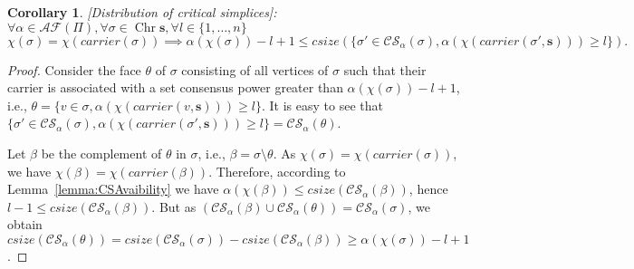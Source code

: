 \documentclass[a4paper]{article}
\newtheorem{corollary}[theorem]{Corollary}
\def\HSS{\mathit{csize}}
\def\s {\mathbf{s}}
\def\Chr{\operatorname{Chr}}
\def\Car{\mathit{carrier}}
\begin{document}
\begin{corollary}{[Distribution of critical simplices]:\label{lemma:CSDistribution}}
$\forall\alpha\in\mathcal{AF}(\Pi),\forall\sigma\in\Chr\s,\forall l\in\{1,\dots,n\}$
\[\chi(\sigma)=\chi(\Car(\sigma)) \implies 
\alpha(\chi(\sigma))-l+1\leq \HSS(\{\sigma'\in\mathcal{CS}_\alpha(\sigma), \alpha(\chi(\Car(\sigma',\s)))\geq l\}){}.\]
\end{corollary}

\begin{proof}
Consider the face $\theta$ of $\sigma$ consisting of 
all vertices of $\sigma$ such that their carrier is associated 
with a set consensus power greater than $\alpha(\chi(\sigma))-l+1$, 
i.e., $\theta = \{v\in \sigma, \alpha(\chi(\Car(v,\s)))\geq l\}$.
It is easy to see 
that~$\{\sigma'\in\mathcal{CS}_\alpha(\sigma), \alpha(\chi(\Car(\sigma',\s)))\geq l\}=\mathcal{CS}_\alpha(\theta)$.

Let $\beta$ be the complement of $\theta$ in $\sigma$, i.e., $\beta=\sigma\setminus\theta$. 
As $\chi(\sigma)=\chi(\Car(\sigma))$, we have $\chi(\beta)=\chi(\Car(\beta))$. 
Therefore, according to Lemma~\ref{lemma:CSAvaibility} we have 
$\alpha(\chi(\beta))\leq \HSS(\mathcal{CS}_\alpha(\beta))$, hence 
$l-1\leq \HSS(\mathcal{CS}_\alpha(\beta))$.
But as $\left(\mathcal{CS}_\alpha(\beta)\cup\mathcal{CS}_\alpha(\theta)\right)=
\mathcal{CS}_\alpha(\sigma)$, we obtain 
$\HSS(\mathcal{CS}_\alpha(\theta))= \HSS(\mathcal{CS}_\alpha(\sigma))-\HSS(\mathcal{CS}_\alpha(\beta))\geq \alpha(\chi(\sigma))-l+1$.
\end{proof}

\RalphaThm*
\end{document}
